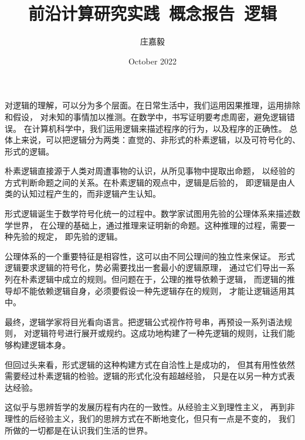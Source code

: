 \documentclass{ctexart}
\title{前沿计算研究实践~概念报告~逻辑}
\author{庄嘉毅}
\date{October 2022}
\begin{document}
\maketitle

对逻辑的理解，可以分为多个层面。在日常生活中，我们运用因果推理，运用排除和假设，
对未知的事情加以推测。在数学中，书写证明要考虑周密，避免逻辑错误。
在计算机科学中，我们运用逻辑来描述程序的行为，以及程序的正确性。
总体上来说，可以把逻辑分为两类：直觉的、非形式的朴素逻辑，以及可符号化的、形式的逻辑。

朴素逻辑直接源于人类对周遭事物的认识，从所见事物中提取出命题，
以经验的方式判断命题之间的关系。在朴素逻辑的观点中，逻辑是后验的，
即逻辑是由人类的认知过程产生的，而非逻辑产生认知。

形式逻辑诞生于数学符号化统一的过程中。数学家试图用先验的公理体系来描述数学世界，
在公理的基础上，通过推理来证明新的命题。这种推理的过程，需要一种先验的规定，
即先验的逻辑。

公理体系的一个重要特征是相容性，这可以由不同公理间的独立性来保证。
形式逻辑要求逻辑的符号化，势必需要找出一套最小的逻辑原理，
通过它们导出一系列在朴素逻辑中成立的规则。但问题在于，公理的推导依赖于逻辑，
而逻辑的推导却不能依赖逻辑自身，必须要假设一种先逻辑存在的规则，
才能让逻辑适用其中。

最终，逻辑学家将目光看向语言。把逻辑公式视作符号串，再预设一系列语法规则，
对逻辑符号进行展开或规约。这成功地构建了一种先逻辑的规则，让我们能够构建逻辑本身。

但回过头来看，形式逻辑的这种构建方式在自洽性上是成功的，
但其有用性依然需要经过朴素逻辑的检验。逻辑的形式化没有超越经验，
只是在以另一种方式表达经验。

这似乎与思辨哲学的发展历程有内在的一致性。从经验主义到理性主义，
再到非理性的后经验主义，我们的思辨方式在不断地变化，但只有一点是不变的，
我们所做的一切都是在认识我们生活的世界。
\end{document}
